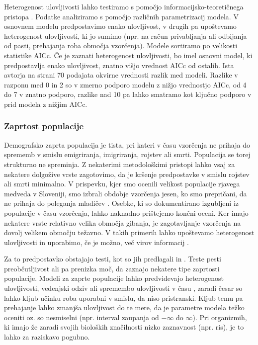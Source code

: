 Heterogenost ulovljivosti lahko testiramo s pomočjo informacijsko-teoretičnega pristopa \citep{burnham_model_2002}. Podatke analiziramo s pomočjo različnih parametrizacij modela. V osnovnem modelu predpostavimo enako ulovljivost, v drugih pa upoštevamo heterogenost ulovljivosti, ki jo sumimo (npr. na račun privabljanja ali odbijanja od pasti, prehajanja roba območja vzorčenja). Modele sortiramo po velikosti statistike AICc. Če je zaznati heterogenost ulovljivosti, bo imel osnovni model, ki predpostavlja enako ulovljivost, znatno višjo vrednost AICc od ostalih. Ista avtorja na strani 70 podajata okvirne vrednosti razlik med modeli. Razlike v razponu med 0 in 2 so v zmerno podporo modelu z nižjo vrednostjo AICc, od 4 do 7 v znatno podporo, razlike nad 10 pa lahko smatramo kot ključno podporo v prid modela z nižjim AICc.

\subsubsection[\bfseries Zaprtost populacije]{Zaprtost populacije}
Demografsko zaprta populacija je tista, pri kateri v času vzorčenja ne prihaja do sprememb v smislu emigriranja, imigriranja, rojstev ali smrti. Populacija se torej strukturno ne spreminja. Z nekaterimi metodološkimi pristopi lahko vsaj za nekatere dolgožive vrste zagotovimo, da je kršenje predpostavke v smislu rojstev ali smrti minimalno. V prispevku, kjer smo ocenili velikost populacije rjavega medveda v Sloveniji, smo izbrali obdobje vzorčenja jesen, ko smo prepričani, da ne prihaja do poleganja mladičev \citep{skrbinsek_lustrik_2019}. Osebke, ki so dokumentirano izgubljeni iz populacije v času vzorčenja, lahko naknadno prištejemo končni oceni. Ker imajo nekatere vrste relativno velika območja gibanja, je zagotavljanje vzorčenja na dovolj velikem območju težavno. V takih primerih lahko upoštevamo heterogenost ulovljivosti in uporabimo, če je možno, več virov informacij \citep{boulanger_multiple_2008}.

Za to predpostavko obstajajo testi, kot so jih predlagali \citet{otis_statistical_1978} in \citet{stanley_closure_1999}. Teste pesti preobčutljivost ali pa prenizka moč, da zaznajo nekatere tipe zaprtosti populacije. Modeli za zaprte populacije lahko predvidevajo heterogenost ulovljivosti, vedenjski odziv ali spremembo ulovljivosti v času \citep{otis_statistical_1978}, zaradi česar so lahko kljub učinku roba uporabni v smislu, da niso pristranski. Kljub temu pa prehajanje lahko zmanjša ulovljivost do te mere, da je parametre modela težko oceniti oz. so nesmiselni (npr. interval zaupanja od $-\infty$ do $\infty$). Pri organizmih, ki imajo že zaradi svojih bioloških značilnosti nizko zaznavnost (npr. ris), je to lahko za raziskavo pogubno.

